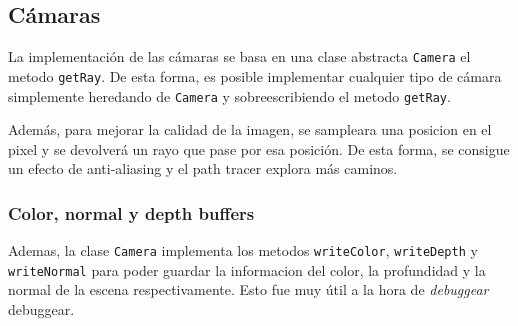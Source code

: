 \documentclass{article}
\begin{document}
\subsection{Cámaras}

La implementación de las cámaras se basa en una clase abstracta \texttt{Camera} 
el metodo \texttt{getRay}. De esta forma, es posible implementar cualquier tipo
de cámara simplemente heredando de \texttt{Camera} y sobreescribiendo el metodo
\texttt{getRay}.

Además, para mejorar la calidad de la imagen, se sampleara una posicion en el
pixel y se devolverá un rayo que pase por esa posición. De esta forma, se
consigue un efecto de anti-aliasing y el path tracer explora más caminos.

\subsubsection{Color, normal y depth buffers}

Ademas, la clase \texttt{Camera} implementa los metodos \texttt{writeColor},
\texttt{writeDepth} y \texttt{writeNormal} para poder guardar la informacion del
color, la profundidad y la normal de la escena respectivamente. Esto fue muy
útil a la hora de \textit{debuggear} debuggear.
\end{document}
